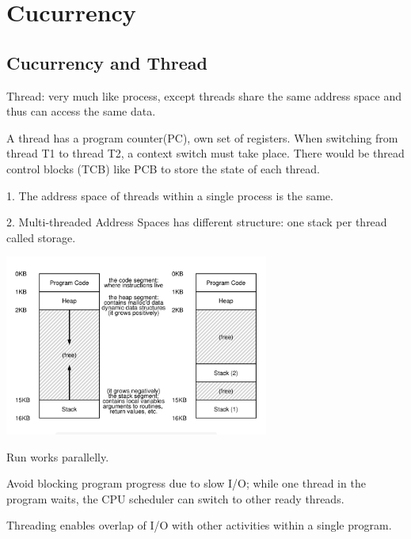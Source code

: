 \chapter{Cucurrency}

\section{Cucurrency and Thread}

    Thread: very much like process, except threads share the same address space and thus
    can access the same data.



    A thread has a program counter(PC), own set of registers. When switching from
    thread T1 to thread T2, a context switch must take place. There would be 
    thread control blocks (TCB) like PCB to store the state of each thread.


    1. The address space of threads within a single process is the same.

    2. Multi-threaded Address Spaces has different structure: one stack per thread called
     storage.

    \includegraphics[width=0.65\textwidth]{chapters/Cucurrency/Cucurrency/ThreadAddressSpace.png}



    Run works parallelly.


    Avoid blocking program progress due to slow I/O; while one thread
    in the program waits, the CPU scheduler can switch to other ready threads.

    Threading enables overlap of I/O with other activities within a single program.

